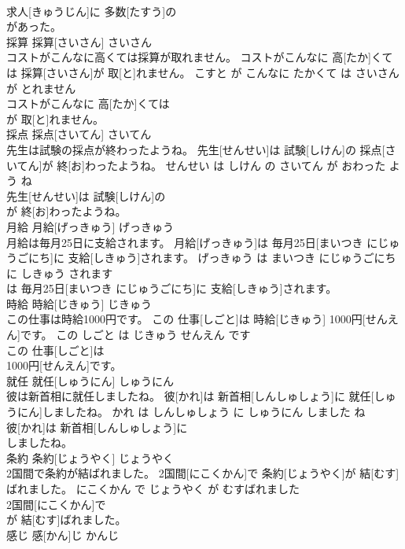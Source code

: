\documentclass[8pt]{extreport}
\begin{document}
\begin{CJK}{UTF8}{min}
\\	求人[きゅうじん]に 多数[たすう]の
\\	があった。			
\\	採算	採算[さいさん]	さいさん	
\\	コストがこんなに高くては採算が取れません。	コストがこんなに 高[たか]くては 採算[さいさん]が 取[と]れません。	こすと が こんなに たかくて は さいさん が とれません	
\\	コストがこんなに 高[たか]くては
\\	が 取[と]れません。			
\\	採点	採点[さいてん]	さいてん	
\\	先生は試験の採点が終わったようね。	先生[せんせい]は 試験[しけん]の 採点[さいてん]が 終[お]わったようね。	せんせい は しけん の さいてん が おわった よう ね	
\\	先生[せんせい]は 試験[しけん]の
\\	が 終[お]わったようね。			
\\	月給	月給[げっきゅう]	げっきゅう	
\\	月給は毎月25日に支給されます。	月給[げっきゅう]は 毎月25日[まいつき にじゅうごにち]に 支給[しきゅう]されます。	げっきゅう は まいつき にじゅうごにち に しきゅう されます	
\\	は 毎月25日[まいつき にじゅうごにち]に 支給[しきゅう]されます。			
\\	時給	時給[じきゅう]	じきゅう	
\\	この仕事は時給1000円です。	この 仕事[しごと]は 時給[じきゅう] 1000円[せんえん]です。	この しごと は じきゅう せんえん です	
\\	この 仕事[しごと]は
\\	1000円[せんえん]です。			
\\	就任	就任[しゅうにん]	しゅうにん	
\\	彼は新首相に就任しましたね。	彼[かれ]は 新首相[しんしゅしょう]に 就任[しゅうにん]しましたね。	かれ は しんしゅしょう に しゅうにん しました ね	
\\	彼[かれ]は 新首相[しんしゅしょう]に
\\	しましたね。			
\\	条約	条約[じょうやく]	じょうやく	
\\	2国間で条約が結ばれました。	2国間[にこくかん]で 条約[じょうやく]が 結[むす]ばれました。	にこくかん で じょうやく が むすばれました	
\\	2国間[にこくかん]で
\\	が 結[むす]ばれました。			
\\	感じ	感[かん]じ	かんじ	

\end{CJK}
\end{document}
